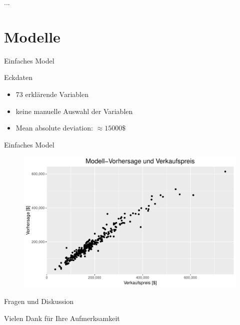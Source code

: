 \documentclass[10pt]{beamer}
\begin{document}
\begin{frame}{...}
	

\end{frame}

\section{Modelle}

\begin{frame}{Einfaches Model}
	
	\begin{Large}{Eckdaten}\end{Large}
	\begin{itemize}
		\item 73 erklärende Variablen
		\item keine manuelle Auswahl der Variablen
		\item Mean absolute deviation: $\approx 15 000 \$$
	\end{itemize}
	
\end{frame}

\begin{frame}{Einfaches Model}
	
	\begin{figure}
		\includegraphics[width=\textwidth, keepaspectratio]{figures/simple_model}
	\end{figure}
	
\end{frame}


\begin{frame}{Fragen und Diskussion}
	\begin{LARGE}
		\begin{center}
			Vielen Dank für Ihre Aufmerksamkeit
		\end{center}
	\end{LARGE}
\end{frame}
\end{document}
